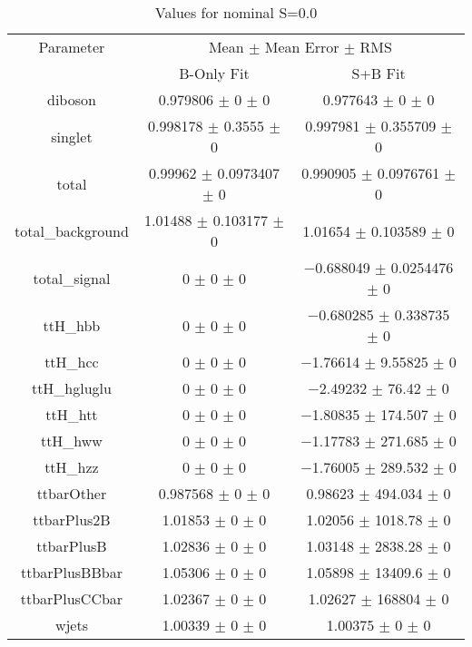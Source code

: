 \begin{table}
\centering
\caption{Values for nominal S=0.0}
\begin{tabular}{ccc}
\toprule
Parameter & \multicolumn{2}{c}{Mean $\pm$ Mean Error $\pm$ RMS}\\
 & B-Only Fit & S+B Fit\\
\midrule
diboson & \num{0.979806} $\pm$ \num{0} $\pm$ \num{0} & \num{0.977643} $\pm$ \num{0} $\pm$ \num{0}\\
singlet & \num{0.998178} $\pm$ \num{0.3555} $\pm$ \num{0} & \num{0.997981} $\pm$ \num{0.355709} $\pm$ \num{0}\\
total & \num{0.99962} $\pm$ \num{0.0973407} $\pm$ \num{0} & \num{0.990905} $\pm$ \num{0.0976761} $\pm$ \num{0}\\
total\_background & \num{1.01488} $\pm$ \num{0.103177} $\pm$ \num{0} & \num{1.01654} $\pm$ \num{0.103589} $\pm$ \num{0}\\
total\_signal & \num{0} $\pm$ \num{0} $\pm$ \num{0} & \num{-0.688049} $\pm$ \num{0.0254476} $\pm$ \num{0}\\
ttH\_hbb & \num{0} $\pm$ \num{0} $\pm$ \num{0} & \num{-0.680285} $\pm$ \num{0.338735} $\pm$ \num{0}\\
ttH\_hcc & \num{0} $\pm$ \num{0} $\pm$ \num{0} & \num{-1.76614} $\pm$ \num{9.55825} $\pm$ \num{0}\\
ttH\_hgluglu & \num{0} $\pm$ \num{0} $\pm$ \num{0} & \num{-2.49232} $\pm$ \num{76.42} $\pm$ \num{0}\\
ttH\_htt & \num{0} $\pm$ \num{0} $\pm$ \num{0} & \num{-1.80835} $\pm$ \num{174.507} $\pm$ \num{0}\\
ttH\_hww & \num{0} $\pm$ \num{0} $\pm$ \num{0} & \num{-1.17783} $\pm$ \num{271.685} $\pm$ \num{0}\\
ttH\_hzz & \num{0} $\pm$ \num{0} $\pm$ \num{0} & \num{-1.76005} $\pm$ \num{289.532} $\pm$ \num{0}\\
ttbarOther & \num{0.987568} $\pm$ \num{0} $\pm$ \num{0} & \num{0.98623} $\pm$ \num{494.034} $\pm$ \num{0}\\
ttbarPlus2B & \num{1.01853} $\pm$ \num{0} $\pm$ \num{0} & \num{1.02056} $\pm$ \num{1018.78} $\pm$ \num{0}\\
ttbarPlusB & \num{1.02836} $\pm$ \num{0} $\pm$ \num{0} & \num{1.03148} $\pm$ \num{2838.28} $\pm$ \num{0}\\
ttbarPlusBBbar & \num{1.05306} $\pm$ \num{0} $\pm$ \num{0} & \num{1.05898} $\pm$ \num{13409.6} $\pm$ \num{0}\\
ttbarPlusCCbar & \num{1.02367} $\pm$ \num{0} $\pm$ \num{0} & \num{1.02627} $\pm$ \num{168804} $\pm$ \num{0}\\
wjets & \num{1.00339} $\pm$ \num{0} $\pm$ \num{0} & \num{1.00375} $\pm$ \num{0} $\pm$ \num{0}\\
\bottomrule
\end{tabular}
\end{table}